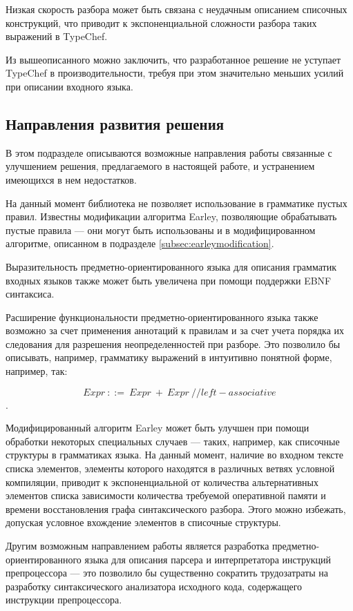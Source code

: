 Низкая скорость разбора может быть связана с неудачным описанием списочных конструкций, что приводит к экспоненциальной сложности разбора таких выражений в TypeChef.

Из вышеописанного можно заключить, что разработанное решение не уступает TypeChef в производительности, требуя при этом значительно меньших усилий при описании входного языка.

\subsection{Направления развития решения}

В этом подразделе описываются возможные направления работы связанные с улучшением решения, предлагаемого в настоящей работе, и устранением имеющихся в нем недостатков. 

На данный момент библиотека не позволяет использование в грамматике пустых правил. Известны модификации алгоритма Earley, позволяющие обрабатывать пустые правила \cite{emptyrules} --- они могут быть использованы и в модифицированном алгоритме, описанном в подразделе \ref{subsec:earleymodification}.

Выразительность предметно-ориентированного языка для описания грамматик входных языков также может быть увеличена при помощи поддержки EBNF синтаксиса.

Расширение функциональности предметно-ориентированного языка также возможно за счет применения аннотаций к правилам и за счет учета порядка их следования для разрешения неопределенностей при разборе. Это позволило бы описывать, например, грамматику выражений в интуитивно понятной форме, например, так: 

$$Expr\ ::=\ Expr\ +\ Expr\ //left-associative$$.

Модифицированный алгоритм Earley может быть улучшен при помощи обработки некоторых специальных случаев --- таких, например, как списочные структуры в грамматиках языка. На данный момент, наличие во входном тексте списка элементов, элементы которого находятся в различных ветвях условной компиляции, приводит к экспоненциальной от количества альтернативных элементов списка зависимости количества требуемой оперативной памяти и времени восстановления графа синтаксического разбора. Этого можно избежать, допуская условное вхождение элементов в списочные структуры.

Другим возможным направлением работы является разработка предметно-ориентированного языка для описания парсера и интерпретатора инструкций препроцессора --- это позволило бы существенно сократить трудозатраты на разработку синтаксического анализатора исходного кода, содержащего инструкции препроцессора.
